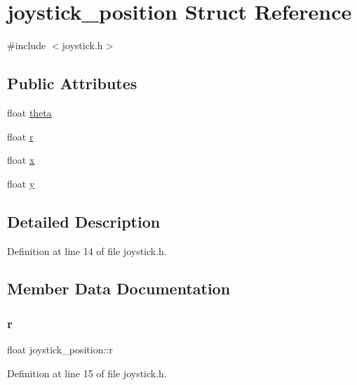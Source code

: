 \hypertarget{structjoystick__position}{}\section{joystick\+\_\+position Struct Reference}
\label{structjoystick__position}


{\ttfamily \#include $<$joystick.\+h$>$}

\subsection*{Public Attributes}
\begin{DoxyCompactItemize}
\item 
float \hyperlink{structjoystick__position_ad738e8acb3656438c10d2ec7670639e5}{theta}
\item 
float \hyperlink{structjoystick__position_a0a9043868a14fce25888dd81b80f6c94}{r}
\item 
float \hyperlink{structjoystick__position_a71c3292c1be3c3400a388eac41a47ad3}{x}
\item 
float \hyperlink{structjoystick__position_ad8fc27fbd5404a4f8cdc1a045a0d689a}{y}
\end{DoxyCompactItemize}


\subsection{Detailed Description}


Definition at line 14 of file joystick.\+h.



\subsection{Member Data Documentation}
\mbox{\label{structjoystick__position_a0a9043868a14fce25888dd81b80f6c94}} 
\subsubsection{\texorpdfstring{r}{r}}
{\footnotesize\ttfamily float joystick\+\_\+position\+::r}



Definition at line 15 of file joystick.\+h.



